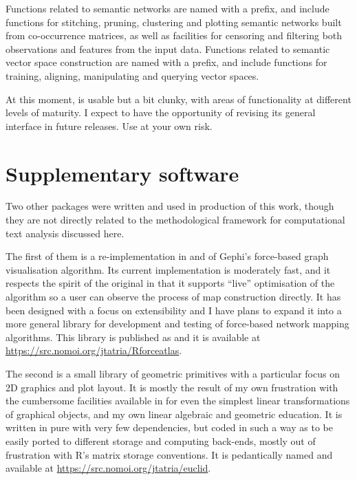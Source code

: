 Functions related to semantic networks are named with a  prefix, and include functions for stitching, pruning, clustering and plotting semantic networks built from co-occurrence matrices, as well as facilities for censoring and filtering both observations and features from the input data.
Functions related to semantic vector space construction are named with a  prefix, and include functions for training, aligning, manipulating and querying vector spaces.

At this moment,  is usable but a bit clunky, with areas of functionality at different levels of maturity.
I expect to have the opportunity of revising its general interface in future releases.
Use at your own risk.

\section{Supplementary software}
\label{sec:other_software}

Two other \R{} packages were written and used in production of this work, though they are not directly related to the methodological framework for computational text analysis discussed here.

The first of them is a re-implementation in \CPP{} and \R{} of Gephi's  force-based graph visualisation algorithm.
Its current implementation is moderately fast, and it respects the spirit of the original in that it supports ``live'' optimisation of the algorithm so a user can observe the process of map construction directly.
It has been designed with a focus on extensibility and I have plans to expand it into a more general library for development and testing of force-based network mapping algorithms.
This library is published as  and it is available at \url{https://src.nomoi.org/jtatria/Rforceatlas}.

The second is a small library of geometric primitives with a particular focus on 2D graphics and plot layout.
It is mostly the result of my own frustration with the cumbersome facilities available in \R{} for even the simplest linear transformations of graphical objects, and my own linear algebraic and geometric education.
It is written in pure \R{} with very few dependencies, but coded in such a way as to be easily ported to different storage and computing back-ends, mostly out of frustration with R's matrix storage conventions.
It is pedantically named  and available at \url{https://src.nomoi.org/jtatria/euclid}.
